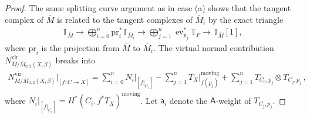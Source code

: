 \documentclass[10pt]{amsart}
\theoremstyle{definition}
\numberwithin{equation}{section}
\newcommand{\vir}{\mathrm{vir}}
\newcommand{\sA}{\mathsf{A}}
\newcommand{\ev}{\operatorname{ev}}
\newcommand{\pr}{\operatorname{pr}}
\begin{document}
\begin{proof}
The same splitting curve argument as in case (a) shows that the tangent complex of $\overline{M}$ is related to the tangent complexes of $\overline{M}_i$ by the exact triangle
\begin{align}\label{tangent cplx splits_b}
    \mathbb T_{\overline{M}}\to \bigoplus_{i=0}^n\mathrm{pr}_i^*\mathbb T_{\overline{M}_i}\to \bigoplus_{j=1}^n\ev_{p_j}^* \mathbb T_{F}\to \mathbb T_{\overline{M}}[1],
\end{align}
where 
$\mathrm{pr}_{i}$ is the projection from $\overline{M}$ to $\overline{M}_{i}$. The virtual normal contribution $N^\vir_{\overline{M}/\overline{M}_{0,2}(X,\beta)}$ breaks into
\begin{align}\label{vir normal splits_b}
    N^\vir_{\overline{M}/\overline{M}_{0,2}(X,\beta)}\big|_{[f\colon C\to X]}=\sum_{i=0}^n N_i\big|_{[f|_{C_i}]}-\sum_{j=1}^n T_X|_{f(p_j)}^{\mathrm{moving}}+\sum_{j=1}^n T_{C_0,p_j}\otimes T_{C_j,p_j}\,, 
\end{align}
where $N_{i}\big|_{[f|_{C_{i}}]}=H^*(C_{i},f^*T_X)^{\mathrm{moving}}$. Let $\mathsf a_i$ denote the $\sA$-weight of $T_{C_j,p_j}$. 





\end{proof}
\end{document}
